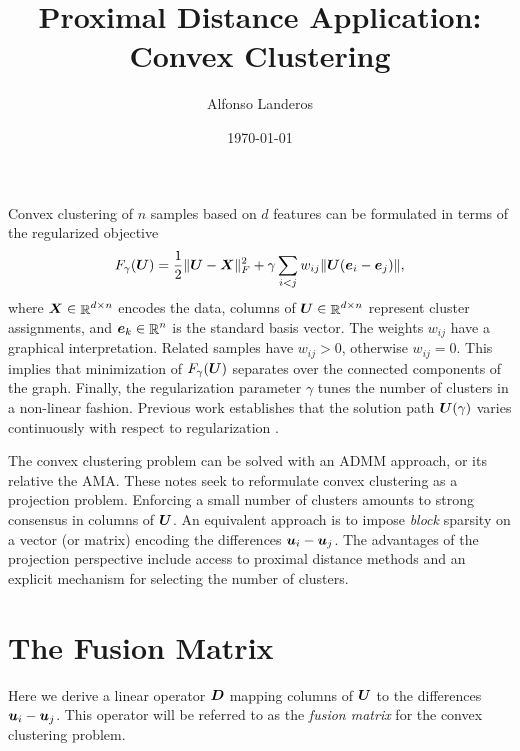 \documentclass{article}
\title{Proximal Distance Application: Convex Clustering}
\author{Alfonso Landeros}
\date{\today}
\begin{document}
\maketitle

Convex clustering of \(n\) samples based on \(d\) features can be formulated in terms of the regularized objective
\begin{equation}
    \label{eq:regularized-objective}
    F_{\gamma}(\boldsymbol{U})
    =
    \frac{1}{2} \|\boldsymbol{U} - \boldsymbol{X}\|_{F}^{2}
    +
    \gamma \sum_{i < j} w_{ij} \|\boldsymbol{U} (\boldsymbol{e}_{i} - \boldsymbol{e}_{j})\|,
\end{equation}
where \(\boldsymbol{X} \in \mathop{\mathbb{R}}\nolimits^{d \times n}\) encodes the data, columns of \(\boldsymbol{U} \in \mathop{\mathbb{R}}\nolimits^{d \times n}\) represent cluster assignments, and \(\boldsymbol{e}_{k} \in \mathop{\mathbb{R}}\nolimits^{n}\) is the standard basis vector.
The weights \(w_{ij}\) have a graphical interpretation.
Related samples have \(w_{ij} > 0\), otherwise \(w_{ij} = 0\).
This implies that minimization of \(F_{\gamma}(\boldsymbol{U})\) separates over the connected components of the graph.
Finally, the regularization parameter \(\gamma\) tunes the number of clusters in a non-linear fashion.
Previous work establishes that the solution path \(\boldsymbol{U}(\gamma)\) varies continuously with respect to regularization \cite{chi2015}.

The convex clustering problem can be solved with an ADMM approach, or its relative the AMA.
These notes seek to reformulate convex clustering as a projection problem.
Enforcing a small number of clusters amounts to strong consensus in columns of \(\boldsymbol{U}\).
An equivalent approach is to impose \textit{block} sparsity on a vector (or matrix) encoding the differences \(\boldsymbol{u}_{i} - \boldsymbol{u}_{j}\).
The advantages of the projection perspective include access to proximal distance methods and an explicit mechanism for selecting the number of clusters.

\section*{\center The Fusion Matrix}

Here we derive a linear operator \(\boldsymbol{D}\) mapping columns of \(\boldsymbol{U}\) to the differences \(\boldsymbol{u}_{i} - \boldsymbol{u}_{j}\).
This operator will be referred to as the \textit{fusion matrix} for the convex clustering problem.
\end{document}
